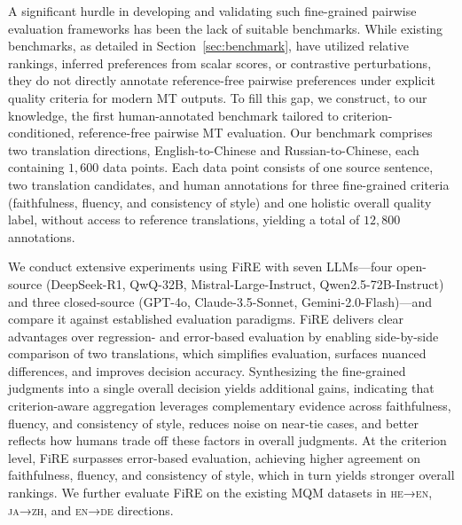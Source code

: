 \documentclass{article}
\theoremstyle{plain}
\theoremstyle{definition}
\theoremstyle{remark}
\newcommand{\engde}{\textsc{en→de} }
\newcommand{\jazhx}{\textsc{ja→zh}}
\newcommand{\heenx}{\textsc{he→en}}
\newcommand{\ours}{FiRE }
\begin{document}

A significant hurdle in developing and validating such fine-grained pairwise evaluation frameworks has been the lack of suitable benchmarks. While existing benchmarks, as detailed in Section~\ref{sec:benchmark}, have utilized relative rankings, inferred preferences from scalar scores, or contrastive perturbations, they do not directly annotate reference-free pairwise preferences under explicit quality criteria for modern MT outputs. To fill this gap, we construct, to our knowledge, the first human-annotated benchmark tailored to criterion-conditioned, reference-free pairwise MT evaluation. Our benchmark comprises two translation directions, English-to-Chinese and Russian-to-Chinese, each containing $1,600$ data points. Each data point consists of one source sentence, two translation candidates, and human annotations for three fine-grained criteria (faithfulness, fluency, and consistency of style) and one holistic overall quality label, without access to reference translations, yielding a total of $12,800$ annotations.


We conduct extensive experiments using \ours with seven LLMs—four open-source (DeepSeek-R1, QwQ-32B, Mistral-Large-Instruct, Qwen2.5-72B-Instruct) and three closed-source (GPT-4o, Claude-3.5-Sonnet, Gemini-2.0-Flash)—and compare it against established evaluation paradigms.
FiRE delivers clear advantages over regression- and error-based evaluation by enabling side-by-side comparison of two translations, which simplifies evaluation, surfaces nuanced differences, and improves decision accuracy. Synthesizing the fine-grained judgments into a single overall decision yields additional gains, indicating that criterion-aware aggregation leverages complementary evidence across faithfulness, fluency, and consistency of style, reduces noise on near-tie cases, and better reflects how humans trade off these factors in overall judgments. At the criterion level, \ours surpasses error-based evaluation, achieving higher agreement on faithfulness, fluency, and consistency of style, which in turn yields stronger overall rankings. We further evaluate \ours on the existing MQM datasets in \heenx, \jazhx, and \engde directions.
\end{document}
